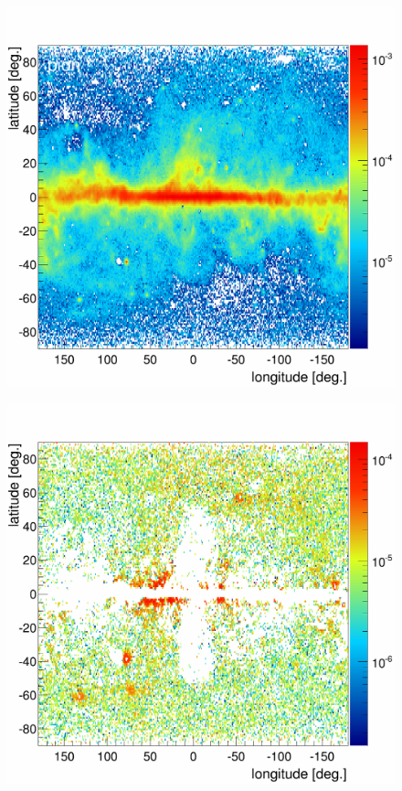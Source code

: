 \newpage
\begin{figure}[H]
  \centering
  \begin{minipage}[h]{0.45\textwidth}
  	\centering
	\includegraphics[width=1.\linewidth]{pic/results/BKG_PCR_Integral.png}
  	\subcaption{}
  	\label{app:BKGonly_PCR}
  \end{minipage}
  \hfill
  \begin{minipage}[h]{0.45\textwidth}
  	\centering
	\includegraphics[width=1.\linewidth]{pic/results/BKG_BR_Integral.png}

\end{minipage}
\end{figure}
